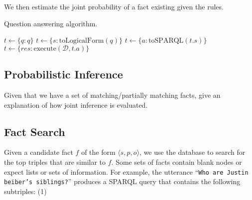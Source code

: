 We then estimate the joint probability of a fact existing given the rules.








\begin{algorithm}
  \caption{Question answering algorithm.}
  \label{alg:probqa-mainalgo}
  \begin{algorithmic}[1]
    \State$t \gets \{\mathit{q}: q\}$
    \State$t \gets \{\mathit{s}: \text{toLogicalForm}(q) \}$
    \State$t \gets \{\mathit{a}: \text{toSPARQL}(t.\mathit{s}) \}$
    \State$t \gets \{\mathit{res}: \text{execute}(\mathcal{D}, t.\mathit{a}) \}$
    \EndProcedure
  \end{algorithmic}
\end{algorithm}





\subsection{Probabilistic Inference}
\label{sec:probqa-inference}
Given that we have a set of matching/partially matching facts, give an
explanation of how joint inference is evaluated.



\subsection{Fact Search}
\label{sec:probqa-search}

Given a candidate fact \(f\) of the form \(\langle s, p, o \rangle\), we use the
database to search for the top triples that are similar to \(f\).
Some sets of facts contain blank nodes or expect lists or sets of information.
For example, the utterance ``\texttt{Who are Justin beiber's siblings?}'' produces 
a SPARQL query that contains the following subtriples: (1)  

